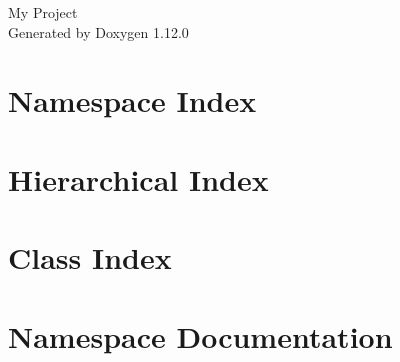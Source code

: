 \documentclass[twoside]{book}
\newcommand{\+}{\discretionary{\mbox{\scriptsize$\hookleftarrow$}}{}{}}
\newcommand{\clearemptydoublepage}{%
    \newpage{\pagestyle{empty}\cleardoublepage}%
  }
\begin{document}
  \raggedbottom
    \hypersetup{pageanchor=false,
                bookmarksnumbered=true,
                pdfencoding=unicode
               }
  \begin{titlepage}
  \vspace*{7cm}
  \begin{center}%
  {\Large My Project}\\
  \vspace*{1cm}
  {\large Generated by Doxygen 1.12.0}\\
  \end{center}
  \end{titlepage}
  \clearemptydoublepage
  \tableofcontents
  \clearemptydoublepage
  \hypersetup{pageanchor=true}
\chapter{Namespace Index}

\chapter{Hierarchical Index}

\chapter{Class Index}

\chapter{Namespace Documentation}

















\end{document}
